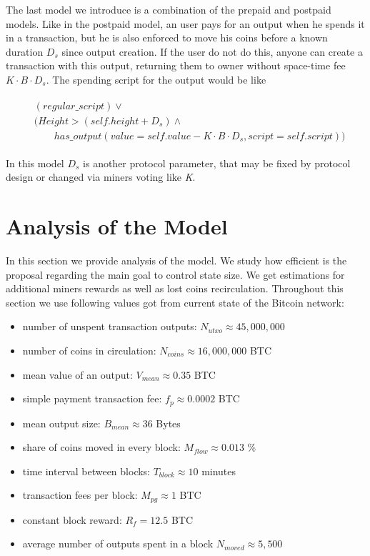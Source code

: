 \documentclass[]{article}   %
\newcommand{\authnote}[2]{\marginpar{\parbox{\marginparwidth}{\tiny %
  \textsf{#1 {\textcolor{blue}{notes: #2}}}}}%
  \textcolor{blue}{\textbf{\dag}}}
\newcommand{\authnote}[2]{
  \textsf{#1 \textcolor{blue}{: #2}}}
\newcommand{\authnote}[2]{}
\newcommand{\dnote}[1]{{\authnote{\textcolor{blue}{Dima notes}}{#1}}}
\begin{document}
The last model we introduce is a combination of the prepaid and postpaid models. Like in the postpaid model, an user pays for an output when he spends it in a transaction, but he is also enforced to move his coins before a known duration $D_{s}$ since output creation. If the user do not do this, anyone can create a transaction with this output, returning them to owner without space-time fee ${K \cdot B \cdot D_{s}}$. The spending script for the output would be like

\begin{align}
\begin{split}
&(regular\_script) \lor \\
&(Height > (self.height + D_s) \land \\  
&\qquad has\_output(value = self.value - K \cdot B \cdot D_s, script = self.script))
\end{split}
\end{align}

\dnote{With this script output is kept for free after $D_s$, if noone spent it.}

In this model $D_s$ is another protocol parameter, that may be fixed by protocol design or changed via miners voting like \textit{K}.

\section{Analysis of the Model}
\label{sec:analysis}

In this section we provide analysis of the model. We study how efficient is the proposal regarding the main goal to control state size. We get estimations for additional miners
rewards as well as lost coins recirculation. Throughout this section we use following values got from current state of the Bitcoin network:

\begin{itemize}
  \item number of unspent transaction outputs: $N_{utxo} \approx 45,000,000$
  \item number of coins in circulation: $N_{coins} \approx 16,000,000$ BTC
  \item mean value of an output: $V_{mean} \approx 0.35$ BTC
  \item simple payment transaction fee: $f_{p} \approx 0.0002$ BTC
  \item mean output size: $B_{mean} \approx 36$ Bytes
  \item share of coins moved in every block: $M_{flow} \approx 0.013$ \%
  \item time interval between blocks: $T_{block} \approx 10$ minutes
  \item transaction fees per block: $M_{pg} \approx 1$ BTC
  \item constant block reward: $R_{f} = 12.5$ BTC
  \item average number of outputs spent in a block $N_{moved} \approx 5,500$ 
\end{itemize}
\end{document}

